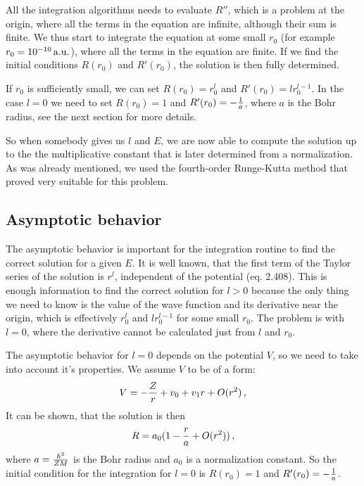 All the integration algorithms needs to evaluate $R''$, which is a problem at the origin, where all the terms in the equation are infinite, although their sum is finite. We thus start to integrate the equation at some small $r_0$ (for example $r_0=10^{-10}\rm\,a.u.$), where all the terms in the equation are finite. If we find the initial conditions $R(r_0)$ and $R'(r_0)$, the solution is then fully determined.

If $r_0$ is sufficiently small, we can set $R(r_0)=r_0^l$ and $R'(r_0)=lr_0^{l-1}$. In the case $l=0$ we need to set $R(r_0)=1$ and $R'(r_0)=-{1\over a}$, where $a$ is the Bohr radius, see the next section for more details.

So when somebody gives us $l$ and $E$, we are now able to compute the solution up to the the multiplicative constant that is later determined from a normalization. As was already mentioned, we used the fourth-order Runge-Kutta method that proved very suitable for this problem.

\subsection{Asymptotic behavior}

The asymptotic behavior is important for the integration routine to find the correct solution for a given $E$. It is well known, that the first term of the Taylor series of the solution is $r^l$, independent of the potential \cite{formanek} (eq. 2.408). This is enough information to find the correct solution for $l>0$ because the only thing we need to know is the value of the wave function and its derivative near the origin, which is effectively $r_0^l$ and $lr_0^{l-1}$ for some small $r_0$. The problem is with $l=0$, where the derivative cannot be calculated just from $l$ and $r_0$.

The asymptotic behavior for $l=0$ depends on the potential $V$, so we need to take into account it's properties. We assume $V$ to be of a form: 
\begin{equation*}
  V=-{Z\over r}+v_0 + v_1r + O(r^2)\,,
\end{equation*}
It can be shown, that the solution is then 
\begin{equation*}
  R=a_0(1-{r\over a}+O(r^2))\,,
\end{equation*}
where $a={\hbar^2\over ZM}$ is the Bohr radius and $a_0$ is a normalization constant. So the initial condition for the integration for $l=0$ is $R(r_0)=1$ and $R'(r_0)=-{1\over a}$.

